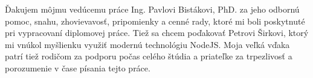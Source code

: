 Ďakujem môjmu vedúcemu práce Ing. Pavlovi Bistákovi, PhD. za jeho odbornú pomoc, snahu, zhovievavosť, pripomienky a cenné rady, ktoré mi boli poskytnuté pri vypracovaní diplomovej práce. Tiež sa chcem poďakovať Petrovi Širkovi, ktorý mi vnúkol myšlienku využiť modernú technológiu NodeJS. Moja veľká vďaka patrí tiež rodičom za podporu počas celého štúdia a priateľke za trpezlivosť a porozumenie v čase písania tejto práce.